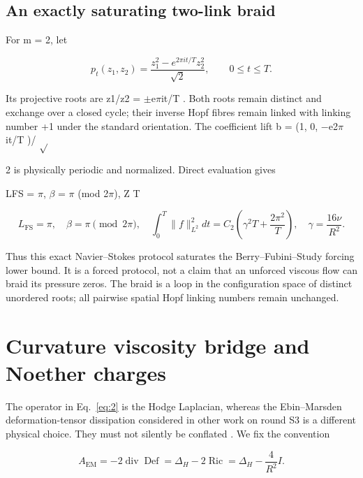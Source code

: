 \documentclass[10pt,letterpaper]{article}
\theoremstyle{remark}
\begin{document}
\subsection{An exactly saturating two-link braid}

For m = 2, let



\begin{equation}
\tag{27}\label{eq:27}
p_t(z_1,z_2)=\frac{z_1^2-e^{2\pi it/T}z_2^2}{\sqrt2},\qquad 0\le t\le T.
\end{equation}

Its projective roots are z1/z2 = \(\pm \)e\(\pi \)it/T . Both roots remain distinct and exchange over a closed cycle; their inverse Hopf fibres remain linked with linking number +1 under the standard orientation. The coefficient lift b = (1, 0, \(- \)e2\(\pi \)it/T )/ \(\sqrt{} \)


2 is physically periodic and normalized. Direct evaluation gives


LFS = \(\pi \), \(\beta \) = \(\pi \) (mod 2\(\pi \)), Z T



\begin{equation}
\tag{28}\label{eq:28}
L_{\mathrm{FS}}=\pi,\quad\beta=\pi\pmod{2\pi},\quad\int_0^T\|f\|_{L^2}^2dt=C_2\left(\gamma^2T+\frac{2\pi^2}T\right),\quad\gamma=\frac{16\nu}{R^2}.
\end{equation}

Thus this exact Navier–Stokes protocol saturates the Berry–Fubini–Study forcing lower bound. It is a forced protocol, not a claim that an unforced viscous flow can braid its pressure zeros. The braid is a loop in the configuration space of distinct unordered roots; all pairwise spatial Hopf linking numbers remain unchanged.


\section{Curvature viscosity bridge and Noether charges}

The operator in Eq.~\eqref{eq:2} is the Hodge Laplacian, whereas the Ebin–Marsden deformation-tensor dissipation considered in other work on round S3 is a different physical choice. They must not silently be conflated \cite{ref8,ref9}. We fix the convention



\begin{equation}
\tag{29}\label{eq:29}
A_{\mathrm{EM}}=-2\operatorname{div}\operatorname{Def}=\Delta_H-2\operatorname{Ric}=\Delta_H-\frac4{R^2}I.
\end{equation}
\end{document}
